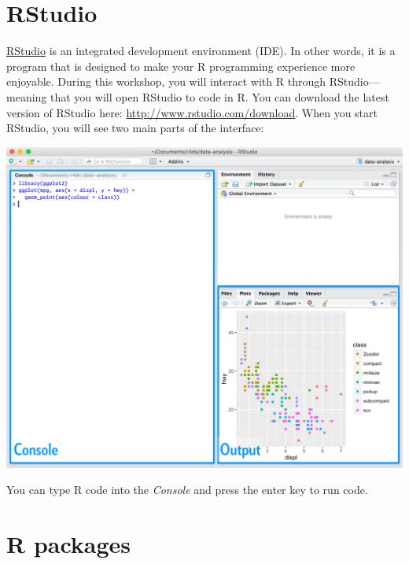 \documentclass[
  12pt,
]{book}
\begin{document}
\hypertarget{rstudio}{%
\section{RStudio}\label{rstudio}}

\href{https://www.rstudio.com}{RStudio} is an integrated development environment (IDE). In other words, it is a program that is designed to make your R programming experience more enjoyable. During this workshop, you will interact with R through RStudio---meaning that you will open RStudio to code in R. You can download the latest version of RStudio here: \url{http://www.rstudio.com/download}. When you start RStudio, you will see two main parts of the interface:

\begin{center}\includegraphics[width=1\linewidth]{images/rstudio-console} \end{center}

You can type R code into the \emph{Console} and press the enter key to run code.

\hypertarget{r-packages}{%
\section{R packages}\label{r-packages}}
\end{document}
